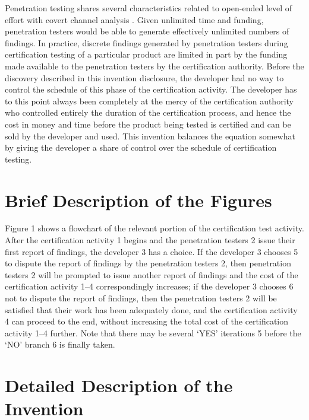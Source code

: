 \documentclass[12pt,letterpaper]{article}
\begin{document}
Penetration testing shares several characteristics related to open-ended level of effort with
covert channel analysis \cite{NCSC-TG-030}.  Given unlimited time and funding, penetration
testers would be able to generate effectively unlimited numbers of findings.  In practice,
discrete findings
generated by penetration testers during certification testing of a particular product are limited
in part by the funding made available to the penetration testers by the certification authority.
Before the discovery described in this invention disclosure, the developer had no way to
control the schedule of this phase of the certification activity.  The developer has to this
point always been completely
at the mercy of the certification authority who controlled entirely the duration of the
certification process, and hence the cost in money and time before the product being tested
is certified and can be sold by the developer and used.  This invention balances the equation
somewhat by giving the developer a share of control over the schedule of certification testing.

\section{Brief Description of the Figures}

Figure 1 shows a flowchart of the relevant portion of the certification test activity.  After
the certification activity 1 begins and the penetration testers 2 issue their first report of
findings, the developer 3 has a choice.  If the developer 3 chooses 5 to dispute the report of
findings by the penetration testers 2, then penetration testers 2 will be prompted to issue
another report of findings and the cost of the certification activity 1--4 correspondingly
increases; if the developer 3 chooses 6 not to dispute the report of findings, then the
penetration testers 2 will be satisfied that their work has been adequately done, and the
certification activity 4 can proceed to the
end, without increasing the total cost of the certification activity 1--4 further.  Note that
there may be several `YES' iterations 5 before the `NO' branch 6 is finally taken.

\section{Detailed Description of the Invention}
\end{document}
